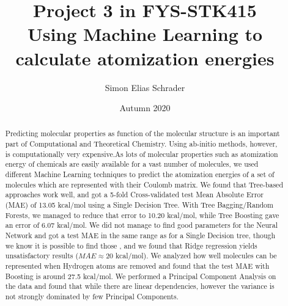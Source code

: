 \documentclass[11pt,a4paper,notitlepage]{article}
\title{Project 3 in FYS-STK415\\ \large Using Machine Learning to calculate atomization energies}
\author{Simon Elias Schrader }
\date{Autumn 2020}
\begin{document}
\maketitle
\tableofcontents
\listoffigures
\listoftables
\clearpage
\begin{abstract}
Predicting molecular properties as function of the molecular structure is an important part of Computational and Theoretical Chemistry. Using ab-initio methods, however, is computationally very expensive.As lots of molecular properties such as atomization energy of chemicals are easily available for a vast number of molecules, we used different Machine Learning techniques to predict the atomization energies of a set of molecules which are represented with their Coulomb matrix. We found that Tree-based approaches work well, and got a 5-fold Cross-validated test Mean Absolute Error (MAE) of 13.05 kcal/mol using a Single Decision Tree. With Tree Bagging/Random Forests, we managed to reduce that error to 10.20 kcal/mol, while Tree Boosting gave an error of 6.07 kcal/mol. We did not manage to find good parameters for the Neural Network and got a test MAE in the same range as for a Single Decision tree, though we know it is possible to find those \citep{Atomization_network}, and we found that Ridge regression yields unsatisfactory results ($MAE \approx 20$ kcal/mol). We analyzed how well molecules can be represented when Hydrogen atoms are removed and found that the test MAE with Boosting is around 27.5 kcal/mol. We performed a Principal Component Analysis on the data and found that while there are linear dependencies, however the variance is not strongly dominated by few Principal Components. 
\end{abstract}
\end{document}

